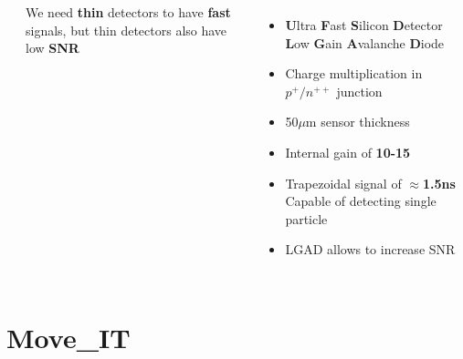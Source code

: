 \documentclass[aspectratio=169]{beamer}
\begin{document}
\begin{frame}
\begin{columns}
\begin{columns}
\begin{center}
			\end{center}
		\begin{center}
			We need \textbf{thin} detectors to have \textbf{fast} signals, but thin detectors also have low \textbf{SNR}
		\end{center}
	\end{columns}
		\begin{itemize}
			\item \textbf{U}ltra \textbf{F}ast \textbf{S}ilicon \textbf{D}etector \textbf{L}ow \textbf{G}ain \textbf{A}valanche \textbf{D}iode
			\item Charge multiplication in $p^+ / n^{++}$ junction 
			\item 50$\mu$m sensor thickness
			\item Internal gain of \textbf{10-15} 
			\item Trapezoidal signal of $\approx$\textbf{1.5ns}\newline
				{\color{blue} Capable of detecting single particle }
			\item LGAD allows to increase SNR 
		\end{itemize}
	\end{columns}
	\end{frame}

	\section{Move\_IT}
	
\end{document}
